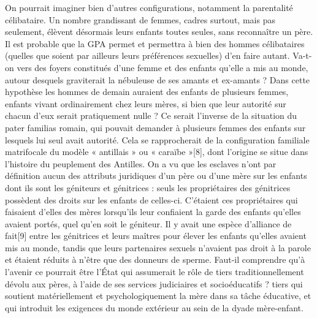  On pourrait imaginer bien d'autres configurations, notamment la parentalité célibataire. Un nombre grandissant de femmes, cadres surtout, mais pas seulement, élèvent désormais leurs enfants toutes seules, sans reconnaître un père. Il est probable que la GPA permet et permettra à bien des hommes célibataires (quelles que soient par ailleurs leurs préférences sexuelles) d'en faire autant.
 Va-t-on vers des foyers constitués d'une femme et des enfants qu'elle a mis au monde, autour desquels graviterait la nébuleuse de ses amants et ex-amants ? Dans cette hypothèse les hommes de demain auraient des enfants de plusieurs femmes, enfants vivant ordinairement chez leurs mères, si bien que leur autorité sur chacun d'eux serait pratiquement nulle ? Ce serait l'inverse de la situation du pater familias romain, qui pouvait demander à plusieurs femmes des enfants sur lesquels lui seul avait autorité. Cela se rapprocherait de la configuration familiale matrifocale du modèle « antillais » ou « caraïbe »[8], dont l'origine se situe dans l'histoire du peuplement des Antilles. On a vu que les esclaves n'ont par définition aucun des attributs juridiques d'un père ou d'une mère sur les enfants dont ils sont les géniteurs et génitrices : seuls les propriétaires des génitrices possèdent des droits sur les enfants de celles-ci. C'étaient ces propriétaires qui faisaient d'elles des mères lorsqu'ils leur confiaient la garde des enfants qu'elles avaient portés, quel qu'en soit le géniteur. Il y avait une espèce d'alliance de fait[9] entre les génitrices et leurs maîtres pour élever les enfants qu'elles avaient mis au monde, tandis que leurs partenaires sexuels n'avaient pas droit à la parole et étaient réduits à n'être que des donneurs de sperme. 
 Faut-il comprendre qu'à l'avenir ce pourrait être l'État qui assumerait le rôle de tiers traditionnellement dévolu aux pères, à l'aide de ses services judiciaires et socioéducatifs ? tiers qui soutient matériellement et psychologiquement la mère dans sa tâche éducative, et qui introduit les exigences du monde extérieur au sein de la dyade mère-enfant.
 
